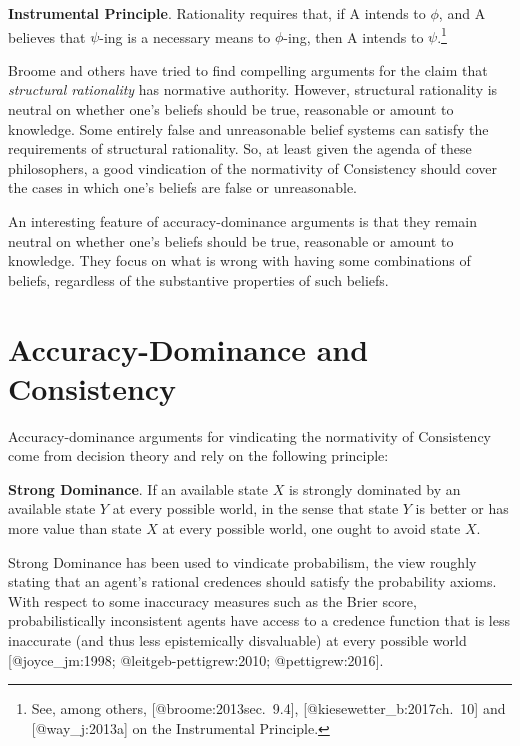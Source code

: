 \documentclass[
]{article}
\begin{document}
\textbf{Instrumental Principle}. Rationality requires that, if A intends
to \(\phi\), and A believes that \(\psi\)-ing is a necessary means to
\(\phi\)-ing, then A intends to \(\psi\).\footnote{See, among others,
  {[}@broome:2013sec.~9.4{]}, {[}@kiesewetter\_b:2017ch.~10{]} and
  {[}@way\_j:2013a{]} on the Instrumental Principle.}

\noindent Broome and others have tried to find compelling arguments for
the claim that \emph{structural rationality} has normative authority.
However, structural rationality is neutral on whether one's beliefs
should be true, reasonable or amount to knowledge. Some entirely false
and unreasonable belief systems can satisfy the requirements of
structural rationality. So, at least given the agenda of these
philosophers, a good vindication of the normativity of Consistency
should cover the cases in which one's beliefs are false or unreasonable.

An interesting feature of accuracy-dominance arguments is that they
remain neutral on whether one's beliefs should be true, reasonable or
amount to knowledge. They focus on what is wrong with having some
combinations of beliefs, regardless of the substantive properties of
such beliefs.

\hypertarget{PREFIXaccuracy-dominance-and-consistency}{%
\section{Accuracy-Dominance and
Consistency}\label{PREFIXaccuracy-dominance-and-consistency}}

Accuracy-dominance arguments for vindicating the normativity of
Consistency come from decision theory and rely on the following
principle:

\textbf{Strong Dominance}. If an available state \(X\) is strongly
dominated by an available state \(Y\) at every possible world, in the
sense that state \(Y\) is better or has more value than state \(X\) at
every possible world, one ought to avoid state \(X\).

\noindent Strong Dominance has been used to vindicate probabilism, the
view roughly stating that an agent's rational credences should satisfy
the probability axioms. With respect to some inaccuracy measures such as
the Brier score, probabilistically inconsistent agents have access to a
credence function that is less inaccurate (and thus less epistemically
disvaluable) at every possible world {[}@joyce\_jm:1998;
@leitgeb-pettigrew:2010; @pettigrew:2016{]}.
\end{document}
